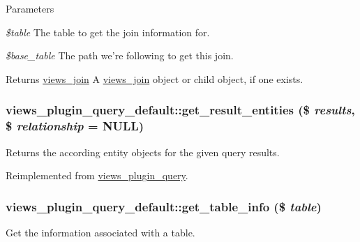 \begin{DoxyParams}{Parameters}
\item[{\em \$table}]The table to get the join information for. \item[{\em \$base\_\-table}]The path we're following to get this join.\end{DoxyParams}
\begin{DoxyReturn}{Returns}
\hyperlink{classviews__join}{views\_\-join} A \hyperlink{classviews__join}{views\_\-join} object or child object, if one exists. 
\end{DoxyReturn}
\hypertarget{classviews__plugin__query__default_ad6e3fe94f3e287c1b8f2c7a9d567066d}{
\subsubsection[{get\_\-result\_\-entities}]{\setlength{\rightskip}{0pt plus 5cm}views\_\-plugin\_\-query\_\-default::get\_\-result\_\-entities (\$ {\em results}, \/  \$ {\em relationship} = {\ttfamily NULL})}}
\label{classviews__plugin__query__default_ad6e3fe94f3e287c1b8f2c7a9d567066d}
Returns the according entity objects for the given query results. 

Reimplemented from \hyperlink{classviews__plugin__query_a36cb34e719977950d9d78a4f11f761a8}{views\_\-plugin\_\-query}.\hypertarget{classviews__plugin__query__default_a67c7184eec8e3bb6a913e52696bd2c35}{
\subsubsection[{get\_\-table\_\-info}]{\setlength{\rightskip}{0pt plus 5cm}views\_\-plugin\_\-query\_\-default::get\_\-table\_\-info (\$ {\em table})}}
\label{classviews__plugin__query__default_a67c7184eec8e3bb6a913e52696bd2c35}
Get the information associated with a table.


